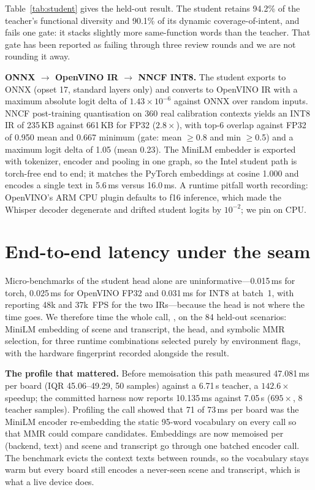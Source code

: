 Table~\ref{tab:student} gives the held-out result. The student retains 94.2\% of
the teacher's functional diversity and 90.1\% of its dynamic coverage-of-intent,
and fails one gate: it stacks slightly more same-function words than the
teacher. That gate has been reported as failing through three review rounds and
we are not rounding it away.

\textbf{ONNX $\rightarrow$ OpenVINO IR $\rightarrow$ NNCF INT8.} The student
exports to ONNX (opset 17, standard layers only) and converts to OpenVINO IR \citep{openvino}
with a maximum absolute logit delta of $1.43\times10^{-6}$ against ONNX over
random inputs. NNCF post-training quantisation on 360 real calibration contexts
yields an INT8 IR of 235\,KB against 661\,KB for FP32 ($2.8\times$), with top-6
overlap against FP32 of 0.950 mean and 0.667 minimum (gate: mean $\ge$0.8 and
min $\ge$0.5) and a maximum logit delta of 1.05 (mean 0.23). The MiniLM embedder
is exported with tokenizer, encoder and pooling in one graph, so the Intel
student path is torch-free end to end; it matches the PyTorch embeddings at
cosine 1.000 and encodes a single text in 5.6\,ms versus 16.0\,ms. A runtime
pitfall worth recording: OpenVINO's ARM CPU plugin defaults to f16 inference,
which made the Whisper decoder degenerate and drifted student logits by
$10^{-2}$; we pin  on CPU.

\section{End-to-end latency under the seam}\label{sec:latency}

Micro-benchmarks of the student head alone are uninformative---0.015\,ms for
torch, 0.025\,ms for OpenVINO FP32 and 0.031\,ms for INT8 at batch~1, with
 reporting 48k and 37k~FPS for the two IRs---because the
head is not where the time goes. We therefore time the whole call,
, on the 84 held-out scenarios: MiniLM
embedding of scene and transcript, the head, and symbolic MMR selection, for
three runtime combinations selected purely by environment flags, with the
hardware fingerprint recorded alongside the result.

\textbf{The profile that mattered.} Before memoisation this path measured
47.081\,ms per board (IQR 45.06--49.29, 50 samples) against a 6.71\,s teacher, a
$142.6\times$ speedup; the committed harness now reports 10.135\,ms against
7.05\,s ($695\times$, 8 teacher samples). Profiling the call showed that 71 of
73\,ms per board was the MiniLM encoder re-embedding the static 95-word
vocabulary on every call so that MMR could compare candidates. Embeddings are
now memoised per (backend, text) and scene and transcript go through one batched
encoder call. The benchmark evicts the context texts between rounds, so the
vocabulary stays warm but every board still encodes a never-seen scene and
transcript, which is what a live device does.

